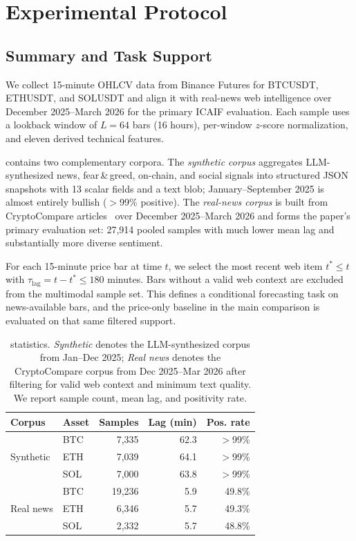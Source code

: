 \section{Experimental Protocol}
\label{sec:exp}

\subsection{\dataset{} Summary and Task Support}
We collect 15-minute OHLCV data from Binance Futures for BTCUSDT, ETHUSDT, and SOLUSDT and align it with real-news web intelligence over December 2025--March 2026 for the primary ICAIF evaluation.
Each sample uses a lookback window of $L=64$ bars (16 hours), per-window $z$-score normalization, and eleven derived technical features.

\dataset{} contains two complementary corpora.
The \emph{synthetic corpus} aggregates LLM-synthesized news, fear\,\&\,greed, on-chain, and social signals into structured JSON snapshots with 13 scalar fields and a text blob; January--September 2025 is almost entirely bullish ($>$99\% positive).
The \emph{real-news corpus} is built from CryptoCompare articles~\cite{cryptocompare2025} over December 2025--March 2026 and forms the paper's primary evaluation set: 27{,}914 pooled samples with much lower mean lag and substantially more diverse sentiment.

For each 15-minute price bar at time $t$, we select the most recent web item $t^* \leq t$ with $\tau_{\mathrm{lag}} = t - t^* \leq 180$ minutes.
Bars without a valid web context are excluded from the multimodal sample set.
This defines a conditional forecasting task on news-available bars, and the price-only baseline in the main comparison is evaluated on that same filtered support.

\begin{table}[t]
\caption{\dataset{} statistics. \emph{Synthetic} denotes the LLM-synthesized corpus from Jan--Dec 2025; \emph{Real news} denotes the CryptoCompare corpus from Dec 2025--Mar 2026 after filtering for valid web context and minimum text quality. We report sample count, mean lag, and positivity rate.}
\label{tab:dataset}
\centering
\small
\setlength{\tabcolsep}{4pt}
\renewcommand{\arraystretch}{1.05}
\begin{tabular}{llrrr}
\toprule
Corpus & Asset & Samples & Lag (min) & Pos. rate \\
\midrule
\multirow{3}{*}{Synthetic} & BTC & 7{,}335 & 62.3 & $>$99\% \\
 & ETH & 7{,}039 & 64.1 & $>$99\% \\
 & SOL & 7{,}000 & 63.8 & $>$99\% \\
\midrule
\multirow{3}{*}{Real news} & BTC & 19{,}236 & 5.9 & 49.8\% \\
 & ETH & 6{,}346 & 5.7 & 49.3\% \\
 & SOL & 2{,}332 & 5.7 & 48.8\% \\
\bottomrule
\end{tabular}
\end{table}

